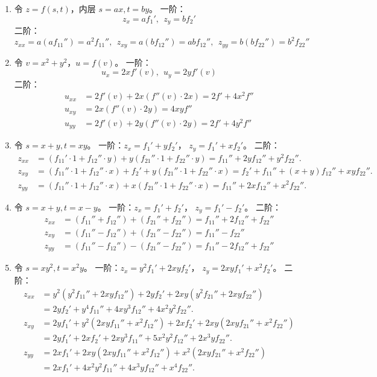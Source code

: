\documentclass[lang=cn,11pt]{elegantbook}
\begin{document}
\begin{solution}
\begin{enumerate}
  \item[(1)] 令 $z=f(s,t)$，内层 $s=ax, t=by$。
  一阶：\[z_x = af_1',~~z_y = bf_2'\]
  二阶：  \[z_{xx} = a(af_{11}'') = a^2 f_{11}'',~~z_{xy} = a(bf_{12}'') = ab f_{12}'',~~z_{yy} = b(bf_{22}'') = b^2 f_{22}''\]
  \item[(2)] 令 $v=x^2+y^2$，$u=f(v)$。
  一阶：\[u_x = 2xf'(v),~~u_y = 2yf'(v)\]
  二阶：
  \begin{align*}
  u_{xx} &= 2f'(v) + 2x(f''(v)\cdot 2x) = 2f' + 4x^2 f''\\
  u_{xy} &= 2x(f''(v)\cdot 2y) = 4xy f''\\
  u_{yy} &= 2f'(v) + 2y(f''(v)\cdot 2y) = 2f' + 4y^2 f''
  \end{align*}
  \item[(3)] 令 $s=x+y, t=xy$。
  一阶：$z_x = f_1' + yf_2'$， $z_y = f_1' + xf_2'$。
  二阶：
  \begin{align*}
  z_{xx} &= (f_{11}'\cdot 1 + f_{12}''\cdot y) + y(f_{21}''\cdot 1 + f_{22}''\cdot y) = f_{11}'' + 2yf_{12}'' + y^2f_{22}''. \\
  z_{xy} &= (f_{11}''\cdot 1 + f_{12}''\cdot x) + f_2' + y(f_{21}''\cdot 1 + f_{22}''\cdot x) = f_2' + f_{11}'' + (x+y)f_{12}'' + xyf_{22}''. \\
  z_{yy} &= (f_{11}''\cdot 1 + f_{12}''\cdot x) + x(f_{21}''\cdot 1 + f_{22}''\cdot x) = f_{11}'' + 2xf_{12}'' + x^2f_{22}''.
  \end{align*}

  \item[(4)] 令 $s=x+y, t=x-y$。
  一阶：$z_x = f_1' + f_2'$， $z_y = f_1' - f_2'$。
  二阶：
  \begin{align*}
  z_{xx} &= (f_{11}'' + f_{12}'') + (f_{21}'' + f_{22}'') = f_{11}'' + 2f_{12}'' + f_{22}''\\
  z_{xy} &= (f_{11}'' - f_{12}'') + (f_{21}'' - f_{22}'') = f_{11}'' - f_{22}''\\
  z_{yy} &= (f_{11}'' - f_{12}'') - (f_{21}'' - f_{22}'') = f_{11}'' - 2f_{12}'' + f_{22}''
  \end{align*}
  \item[(5)] 令 $s=xy^2, t=x^2y$。
  一阶：$z_x = y^2f_1' + 2xyf_2'$， $z_y = 2xyf_1' + x^2f_2'$。
  二阶：
  \begin{align*}
  z_{xx} &= y^2(y^2f_{11}'' + 2xyf_{12}'') + 2y f_2' + 2xy(y^2f_{21}'' + 2xyf_{22}'') \\
         &= 2y f_2' + y^4 f_{11}'' + 4xy^3 f_{12}'' + 4x^2y^2 f_{22}''. \\
  z_{xy} &= 2y f_1' + y^2(2xy f_{11}'' + x^2 f_{12}'') + 2x f_2' + 2xy(2xy f_{21}'' + x^2 f_{22}'') \\
         &= 2yf_1' + 2xf_2' + 2xy^3 f_{11}'' + 5x^2y^2 f_{12}'' + 2x^3y f_{22}''. \\
  z_{yy} &= 2x f_1' + 2xy(2xy f_{11}'' + x^2 f_{12}'') + x^2(2xy f_{21}'' + x^2 f_{22}'') \\
         &= 2xf_1' + 4x^2y^2 f_{11}'' + 4x^3y f_{12}'' + x^4 f_{22}''.
  \end{align*}


\end{enumerate}
\end{solution}
\end{document}
